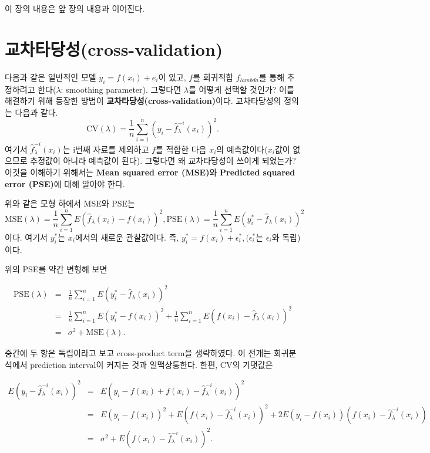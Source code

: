 \documentclass[b5paper,]{book}
\theoremstyle{definition}
\theoremstyle{definition}
\theoremstyle{definition}
\theoremstyle{remark}
\begin{document}
이 장의 내용은 앞 장의 내용과 이어진다.

\section{교차타당성(cross-validation)}\label{cross-validation}

다음과 같은 일반적인 모델 \(y_{i}=f(x_{i})+e_{i}\)이 있고, \(f\)를
회귀적합 \(f_{lambda}\)를 통해 추정하려고 한다(\(\lambda\): smoothing
parameter). 그렇다면 \(\lambda\)를 어떻게 선택할 것인가? 이를 해결하기
위해 등장한 방법이 \textbf{교차타당성(cross-validation)}이다.
교차타당성의 정의는 다음과 같다.
\[\text{CV}(\lambda)=\frac{1}{n}\sum_{i=1}^{n}(y_{i}-\hat{f}_{\lambda}^{-i}(x_{i}))^{2}.\]
여기서 \(\hat{f}_{\lambda}^{-i}(x_{i})\)는 i번째 자료를 제외하고 \(f\)를
적합한 다음 \(x_{i}\)의 예측값이다(\(x_{i}\)값이 없으므로 추정값이
아니라 예측값이 된다). 그렇다면 왜 교차타당성이 쓰이게 되었는가? 이것을
이해하기 위해서는 \textbf{Mean squared error (MSE)}와 \textbf{Predicted
squared error (PSE)}에 대해 알아야 한다.

위와 같은 모형 하에서 MSE와 PSE는
\[\text{MSE}(\lambda)=\frac{1}{n}\sum_{i=1}^{n}E(\hat{f}_{\lambda}(x_{i})-f(x_{i}))^{2}, \text{PSE}(\lambda)=\frac{1}{n}\sum_{i=1}^{n}E(y_{i}^{*}-\hat{f}_{\lambda}(x_{i}))^{2}\]
이다. 여기서 \(y_{i}^{*}\)는 \(x_{i}\)에서의 새로운 관찰값이다. 즉,
\(y_{i}^{*}=f(x_{i})+\epsilon_{i}^{*}, (\epsilon_{i}^{*}\)는
\(\epsilon_{i}\)와 독립)이다.

위의 PSE를 약간 변형해 보면

\begin{eqnarray*}
\text{PSE}(\lambda)&=&\frac{1}{n}\sum_{i=1}^{n}E(y_{i}^{*}-\hat{f}_{\lambda}(x_{i}))^{2}\\
&=&\frac{1}{n}\sum_{i=1}^{n}E(y_{i}^{*}-f(x_{i}))^{2}+\frac{1}{n}\sum_{i=1}^{n}E(f(x_{i})-\hat{f}_{\lambda}(x_{i}))^{2}\\
&=&\sigma^{2}+\text{MSE}(\lambda).
\end{eqnarray*}

중간에 두 항은 독립이라고 보고 cross-product term을 생략하였다. 이
전개는 회귀분석에서 prediction interval이 커지는 것과 일맥상통한다.
한편, CV의 기댓값은

\begin{eqnarray*}
E(y_{i}-\hat{f}_{\lambda}^{-i}(x_{i}))^{2}&=&E(y_{i}-f(x_{i})+f(x_{i})-\hat{f}_{\lambda}^{-i}(x_{i}))^{2}\\
&=&E(y_{i}-f(x_{i}))^{2}+E(f(x_{i})-\hat{f}_{\lambda}^{-i}(x_{i}))^{2}+2E(y_{i}-f(x_{i}))(f(x_{i})-\hat{f}_{\lambda}^{-i}(x_{i}))\\
&=&\sigma^{2}+E(f(x_{i})-\hat{f}_{\lambda}^{-i}(x_{i}))^{2}.\\
\end{eqnarray*}
\end{document}
